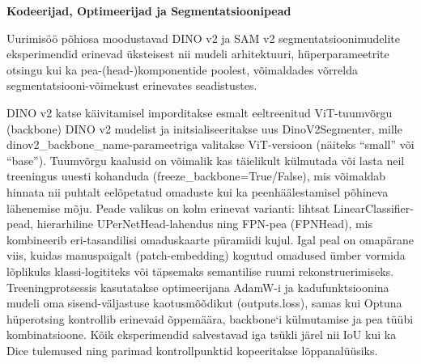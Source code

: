 \textbf{Kodeerijad, Optimeerijad ja Segmentatsioonipead}

Uurimisöö põhiosa moodustavad DINO v2 ja SAM v2 segmentatsioonimudelite eksperimendid erinevad üksteisest nii mudeli
arhitektuuri, hüperparameetrite otsingu kui ka pea-(head-)komponentide poolest,
võimaldades võrrelda segmentatsiooni-võimekust erinevates seadistustes.

DINO v2 katse käivitamisel imporditakse esmalt eeltreenitud ViT-tuumvõrgu (backbone)
DINO v2 mudelist ja initsialiseeritakse uus DinoV2Segmenter, mille
dinov2\_backbone\_name-parameetriga valitakse ViT-versioon (näiteks ``small''
või ``base''). Tuumvõrgu kaalusid on võimalik kas täielikult külmutada või
lasta neil treeningus uuesti kohanduda (freeze\_backbone=True/False), mis
võimaldab hinnata nii puhtalt eelõpetatud omaduste kui ka peenhäälestamisel põhineva lähenemise
mõju. Peade valikus on kolm erinevat varianti: lihtsat LinearClassifier-pead,
hierarhiline UPerNetHead-lahendus ning FPN-pea (FPNHead), mis kombineerib
eri-tasandilisi omaduskaarte püramiidi kujul. Igal peal on omapärane viis,
kuidas manuspaigalt (patch-embedding) kogutud omadused ümber vormida lõplikuks
klassi-logititeks või täpsemaks semantilise ruumi rekonstruerimiseks.
Treeningprotsessis kasutatakse optimeerijana AdamW-i ja kadufunktsioonina mudeli
oma sisend-väljastuse kaotusmõõdikut (outputs.loss), samas kui Optuna
hüperotsing kontrollib erinevaid õppemäära, backbone`i külmutamise ja pea tüübi
kombinatsioone. Kõik eksperimendid salvestavad iga tsükli järel nii IoU kui ka
Dice tulemused ning parimad kontrollpunktid kopeeritakse lõppanalüüsiks.
\bigskip

